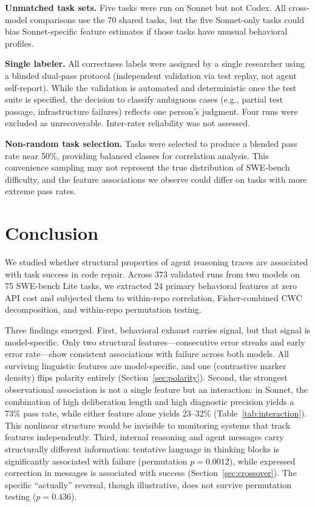 \documentclass[11pt]{article}
\begin{document}
\textbf{Unmatched task sets.}
Five tasks were run on Sonnet but not Codex.
All cross-model comparisons use the 70 shared tasks, but the five Sonnet-only tasks could bias Sonnet-specific feature estimates if those tasks have unusual behavioral profiles.

\textbf{Single labeler.}
All correctness labels were assigned by a single researcher using a blinded dual-pass protocol (independent validation via test replay, not agent self-report).
While the validation is automated and deterministic once the test suite is specified, the decision to classify ambiguous cases (e.g., partial test passage, infrastructure failures) reflects one person's judgment.
Four runs were excluded as unrecoverable.
Inter-rater reliability was not assessed.

\textbf{Non-random task selection.}
Tasks were selected to produce a blended pass rate near 50\%, providing balanced classes for correlation analysis.
This convenience sampling may not represent the true distribution of SWE-bench difficulty, and the feature associations we observe could differ on tasks with more extreme pass rates.


\section{Conclusion}
\label{sec:conclusion}

We studied whether structural properties of agent reasoning traces are associated with task success in code repair.
Across 373 validated runs from two models on 75 SWE-bench Lite tasks, we extracted 24 primary behavioral features at zero API cost and subjected them to within-repo correlation, Fisher-combined CWC decomposition, and within-repo permutation testing.

Three findings emerged.
First, behavioral exhaust carries signal, but that signal is model-specific.
Only two structural features---consecutive error streaks and early error rate---show consistent associations with failure across both models.
All surviving linguistic features are model-specific, and one (contrastive marker density) flips polarity entirely (Section~\ref{sec:polarity}).
Second, the strongest observational association is not a single feature but an interaction: in Sonnet, the combination of high deliberation length and high diagnostic precision yields a 73\% pass rate, while either feature alone yields 23--32\% (Table~\ref{tab:interaction}).
This nonlinear structure would be invisible to monitoring systems that track features independently.
Third, internal reasoning and agent messages carry structurally different information: tentative language in thinking blocks is significantly associated with failure (permutation $p = 0.0012$), while expressed correction in messages is associated with success (Section~\ref{sec:crossover}).
The specific ``actually'' reversal, though illustrative, does not survive permutation testing ($p = 0.436$).
\end{document}
